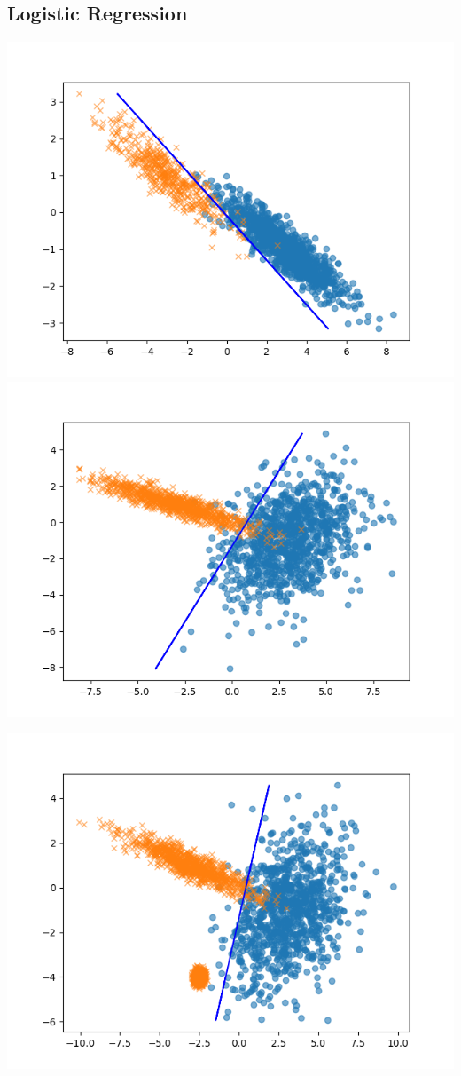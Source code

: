 \subsection{Logistic Regression}
\includegraphics[height= 0.3\textheight]{logisticRegression0.png}
\includegraphics[height= 0.3\textheight]{logisticRegression1.png}
\begin{center}
\includegraphics[height= 0.3\textheight]{logisticRegression2.png}
\end{center}

